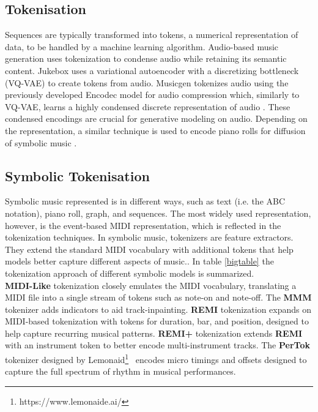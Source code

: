 \subsection{Tokenisation}\label{section:tokenization}
Sequences are typically transformed into tokens, a numerical representation of data, to be handled by a machine learning algorithm. Audio-based music generation uses tokenization to condense audio while retaining its semantic content. Jukebox \cite{Dhariwal_Jun_Payne_Kim_Radford_Sutskever_2020} uses a variational autoencoder\cite{Kingma_Welling_2014} with a discretizing bottleneck (VQ-VAE) to create tokens from audio. Musicgen \cite{copet2023simple} tokenizes audio using the previously developed Encodec model for audio compression which, similarly to VQ-VAE, learns a highly condensed discrete representation of audio \cite{Défossez_2023_encodec}. These condensed encodings are crucial for generative modeling on audio. Depending on the representation, a similar technique is used to encode piano rolls for diffusion of symbolic music \cite{Min_Jiang_Xia_Zhao_polyffusion_2023}\cite{Zhu_Liu_Jiang_Zheng_texture_2024}.

\subsection{Symbolic Tokenisation} \label{section:symbolic_tok}
Symbolic music represented is in different ways, such as text (i.e. the ABC notation), piano roll, graph, and sequences. The most widely used representation, however, is the event-based MIDI representation, which is reflected in the tokenization techniques. In symbolic music, tokenizers are feature extractors. They extend the standard MIDI vocabulary with additional tokens that help models better capture different aspects of music.\cite{Fradet_Briot_Chhel_2021}. In table \ref{bigtable} the tokenization approach of different symbolic models is summarized.\\
\textbf{MIDI-Like} tokenization closely emulates the MIDI vocabulary, translating a MIDI file into a single stream of tokens such as note-on and note-off. The \textbf{MMM} tokenizer adds indicators to aid track-inpainting. \textbf{REMI} \cite{Huang_Yang_remi_pop_transformer_2020} tokenization expands on MIDI-based tokenization with tokens for duration, bar, and position, designed to help capture recurring musical patterns. \textbf{REMI+} \cite{Rütte_figaro_2023} tokenization extends \textbf{REMI} with an instrument token to better encode multi-instrument tracks. The \textbf{PerTok} tokenizer designed by Lemonaid\footnote{https://www.lemonaide.ai/}  encodes micro timings and offsets designed to capture the full spectrum of rhythm in musical performances.\\

